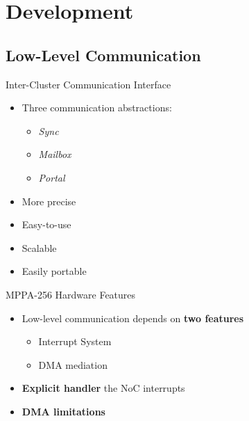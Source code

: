 \section{Development}

	\subsection{Low-Level Communication}

		\begin{frame}[fragile]{Inter-Cluster Communication Interface}

			\begin{itemize}
				\item Three communication abstractions:
				\begin{itemize}
					\item \textit{Sync}
					\item \textit{Mailbox}
					\item \textit{Portal}
				\end{itemize}
				\item More precise
				\item Easy-to-use
				\item Scalable
				\item Easily portable
			\end{itemize}

		\end{frame}

		\begin{frame}[fragile]{MPPA-256 Hardware Features}
			\begin{itemize}
				\item Low-level communication depends on \textbf{two features}
				\begin{itemize}
					\item Interrupt System
					\item DMA mediation
				\end{itemize}
				\item \textbf{Explicit handler} the NoC interrupts %
				\item \textbf{DMA limitations}
			\end{itemize}
		\end{frame}

